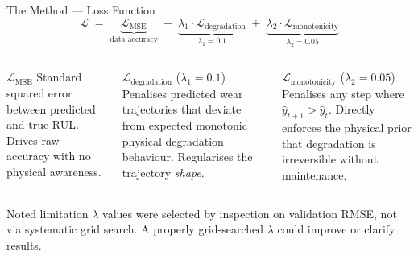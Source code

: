 \documentclass[10pt, aspectratio=169, handout]{beamer}
\begin{document}
\begin{frame}{The Method --- Loss Function}
  \[
    \mathcal{L}
    \;=\;
    \underbrace{\mathcal{L}_{\text{MSE}}}_{\text{data accuracy}}
    \;+\;
    \underbrace{\lambda_1 \cdot \mathcal{L}_{\text{degradation}}}_{\lambda_1 = 0.1}
    \;+\;
    \underbrace{\lambda_2 \cdot \mathcal{L}_{\text{monotonicity}}}_{\lambda_2 = 0.05}
  \]
  \vspace{8pt}
  \begin{columns}[T]
      \begin{block}{$\mathcal{L}_{\text{MSE}}$}
        \small
        Standard squared error between predicted and true RUL.
        Drives raw accuracy with no physical awareness.
      \end{block}

      \begin{block}{$\mathcal{L}_{\text{degradation}}$ ($\lambda_1=0.1$)}
        \small
        Penalises predicted wear trajectories that deviate from expected
        monotonic physical degradation behaviour.
        Regularises the trajectory \emph{shape}.
      \end{block}

      \begin{block}{$\mathcal{L}_{\text{monotonicity}}$ ($\lambda_2=0.05$)}
        \small
        Penalises any step where $\hat{y}_{t+1} > \hat{y}_t$.
        Directly enforces the physical prior that degradation is
        irreversible without maintenance.
      \end{block}
  \end{columns}
  \vspace{10pt}
  \begin{alertblock}{Noted limitation}
    \small
    $\lambda$ values were selected by inspection on validation RMSE, not via systematic
    grid search.  A properly grid-searched $\lambda$ could improve or clarify results.
  \end{alertblock}
\end{frame}
\end{document}
